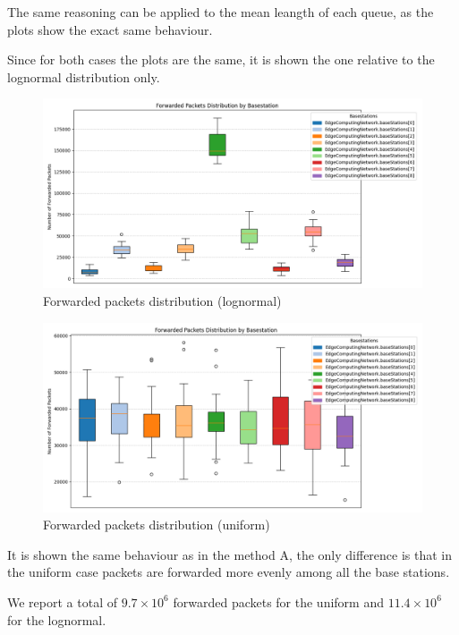 \documentclass{report}
\begin{document}
\begin{flushleft}
The same reasoning can be applied to the mean leangth of each queue, as the plots show the exact same behaviour.
\vspace{1em}

Since for both cases the plots are the same, it is shown the one relative to the lognormal distribution only.
\end{flushleft}
\begin{figure}[H]
    \centering
    \includegraphics[width=\textwidth]{img/plots/log_1e4_B/forwarded.png}
    \caption{Forwarded packets distribution (lognormal)}
\end{figure}

\begin{figure}[H]
    \centering
    \includegraphics[width=\textwidth]{img/plots/uni_1e4_B/forwarded.png}
    \caption{Forwarded packets distribution (uniform)}
\end{figure}

\begin{flushleft}
It is shown the same behaviour as in the method A, the only difference is that in the uniform case packets are forwarded more evenly among all the base stations.
\vspace{1em}

We report a total of $9.7\times10^6$ forwarded packets for the uniform and $11.4\times10^6$ for the lognormal.
\end{flushleft}
\end{document}
